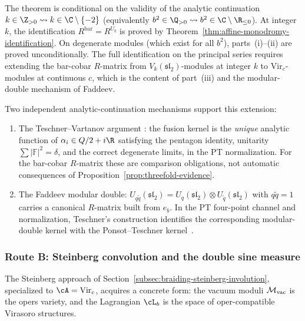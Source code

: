 \begin{remark}
\label{rem:analytic-continuation-gap}
The theorem is conditional on the validity of the analytic
continuation $k \in \Z_{>0} \leadsto k \in \C \setminus
\{-2\}$ (equivalently $b^2 \in \Q_{>0} \leadsto b^2 \in
\C \setminus \R_{\le 0}$). At integer $k$, the identification
$R^{\mathrm{bar}} = R^{U_q}$ is proved by
Theorem~\ref{thm:affine-monodromy-identification}. On degenerate
modules (which exist for all $b^2$), parts~(i)--(ii) are proved
unconditionally. The full identification on the principal series
requires extending the bar-cobar $R$-matrix from
$V_k(\mathfrak{sl}_2)$-modules at integer $k$ to
$\mathrm{Vir}_c$-modules at continuous $c$, which is the content
of part~(iii) and the modular-double mechanism of Faddeev.

Two independent analytic-continuation mechanisms support this
extension:
\begin{enumerate}
\item The Teschner--Vartanov argument
 \cite{TeschnerVartanov}: the fusion kernel is the \emph{unique}
 analytic function of $\alpha_i \in Q/2 + i\R$ satisfying the
 pentagon identity, unitarity $\sum |\mathbb{F}|^2 = \delta$,
 and the correct degenerate limits, in the PT normalization. For the
 bar-cobar $R$-matrix these are comparison obligations, not automatic
 consequences of Proposition~\ref{prop:threefold-evidence}.

\item The Faddeev modular double: $U_{q\tilde q}(\mathfrak{sl}_2)
 = U_q(\mathfrak{sl}_2) \otimes U_{\tilde q}(\mathfrak{sl}_2)$
 with $q \tilde q = 1$ carries a canonical $R$-matrix built from
 $e_b$. In the PT four-point channel and normalization, Teschner's
 construction identifies the corresponding modular-double kernel with
 the Ponsot--Teschner kernel~\cite{TeschnerLiouville}.
\end{enumerate}
\end{remark}

\subsubsection{Route B: Steinberg convolution and the
double sine measure}
\label{subsubsec:route-B-steinberg}

The Steinberg approach of
Section~\ref{subsec:braiding-steinberg-involution},
specialized to $\cA = \mathrm{Vir}_c$, acquires a concrete form:
the vacuum moduli ${\mathcal{M}_{\mathrm{vac}}}$ is the opers variety, and the
Lagrangian $\cL_b$ is the space of oper-compatible Virasoro
structures.

